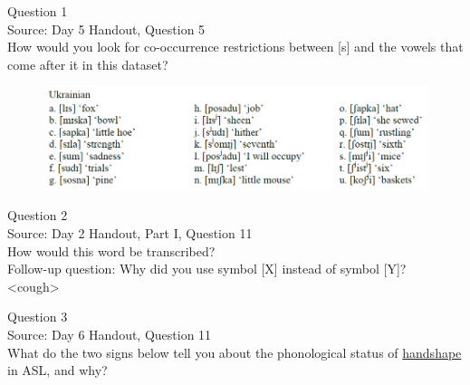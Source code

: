 \documentclass[12pt]{article}
\begin{document}
{\large Question 1}\\

Source: Day 5 Handout, Question 5\\

How would you look for co-occurrence restrictions between [s] and the vowels that come after it in this dataset?\\

\begin{figure}[H]
\includegraphics{../images/ukrainian.png}
\end{figure}

\newpage

{\large Question 2}\\

Source: Day 2 Handout, Part I, Question 11\\

How would this word be transcribed?\\ Follow-up question: Why did you use symbol [X] instead of symbol [Y]?\\

<cough>


\newpage

{\large Question 3}\\

Source: Day 6 Handout, Question 11\\

What do the two signs below tell you about the phonological status of \underline{handshape} in ASL, and why?\\
\end{document}
